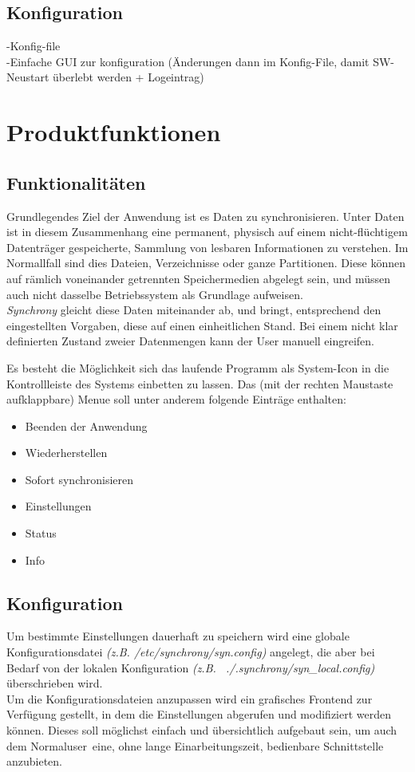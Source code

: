 \documentclass[12pt,oneside,a4paper,bibtotoc,liststotoc,pointlessnumbers]{scrartcl}
\begin{document}
\subsection{Konfiguration}
-Konfig-file\\
-Einfache GUI zur konfiguration (Änderungen dann im Konfig-File, damit SW-Neustart überlebt werden + Logeintrag)
\newpage
\section{Produktfunktionen}
\subsection{Funktionalitäten}
Grundlegendes Ziel der Anwendung ist es Daten zu synchronisieren. Unter Daten ist
in diesem Zusammenhang eine permanent, physisch auf einem nicht-fl\"{u}chtigem Datentr\"{a}ger
gespeicherte, Sammlung von lesbaren Informationen zu verstehen. Im Normallfall sind
dies Dateien, Verzeichnisse oder ganze Partitionen. Diese k\"{o}nnen auf r\"{a}mlich
voneinander getrennten Speichermedien abgelegt sein, und m\"{u}ssen auch nicht
dasselbe Betriebssystem als Grundlage aufweisen.\\
\emph{Synchrony} gleicht diese Daten miteinander ab, und bringt, entsprechend den
eingestellten Vorgaben, diese auf einen einheitlichen Stand. Bei einem nicht
klar definierten Zustand zweier Datenmengen kann der User manuell eingreifen.

Es besteht die M\"{o}glichkeit sich das laufende Programm als System-Icon in die
Kontrollleiste des Systems einbetten zu lassen. Das (mit der rechten Maustaste
aufklappbare) Menue soll unter anderem folgende Eintr\"{a}ge enthalten:
\begin{itemize}
 \item Beenden der Anwendung
\item Wiederherstellen
\item Sofort synchronisieren
\item Einstellungen
\item Status
\item Info
\end{itemize}

\subsection{Konfiguration}
Um bestimmte Einstellungen dauerhaft zu speichern wird eine globale
Konfigurationsdatei \emph{(z.B. /etc/synchrony/syn.config)} angelegt, die aber bei
Bedarf von der lokalen Konfiguration \emph{(z.B. ~./.synchrony/syn\_local.config)}
\"{u}berschrieben wird.\\
Um die Konfigurationsdateien anzupassen wird ein grafisches Frontend zur Verf\"{u}gung
gestellt, in dem die Einstellungen abgerufen und modifiziert werden k\"{o}nnen. Dieses
soll m\"{o}glichst einfach und \"{u}bersichtlich aufgebaut sein, um auch dem
\glqq Normaluser\grqq\ eine, ohne lange Einarbeitungszeit, bedienbare Schnittstelle anzubieten.
\end{document}
